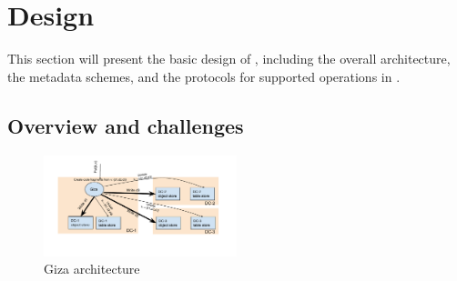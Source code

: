 









\section{Design}

This section will present the basic design of {\name}, including the overall architecture,
the metadata schemes, and the protocols for supported operations in {\name}. 

\subsection{Overview and challenges}

\begin{figure}[tp]
\centering
\includegraphics[width=0.5\textwidth]{fig/Giza}
\caption{Giza architecture\label{fig:arch}}
\end{figure}

